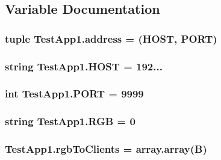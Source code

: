 \subsection{Variable Documentation}
\subsubsection[{\texorpdfstring{address}{address}}]{\setlength{\rightskip}{0pt plus 5cm}tuple Test\+App1.\+address = ({\bf H\+O\+ST}, {\bf P\+O\+RT})}\hypertarget{namespaceTestApp1_a37693e75a952244c15c4f328112913b6}{}\label{namespaceTestApp1_a37693e75a952244c15c4f328112913b6}
\subsubsection[{\texorpdfstring{H\+O\+ST}{HOST}}]{\setlength{\rightskip}{0pt plus 5cm}string Test\+App1.\+H\+O\+ST = \textquotesingle{}192...\textquotesingle{}}\hypertarget{namespaceTestApp1_a32675c1567f50c9219e268d339fefd25}{}\label{namespaceTestApp1_a32675c1567f50c9219e268d339fefd25}
\subsubsection[{\texorpdfstring{P\+O\+RT}{PORT}}]{\setlength{\rightskip}{0pt plus 5cm}int Test\+App1.\+P\+O\+RT = 9999}\hypertarget{namespaceTestApp1_a0a02ae4c9398345071f0ccdd43bc4f3d}{}\label{namespaceTestApp1_a0a02ae4c9398345071f0ccdd43bc4f3d}
\subsubsection[{\texorpdfstring{R\+GB}{RGB}}]{\setlength{\rightskip}{0pt plus 5cm}string Test\+App1.\+R\+GB = \textquotesingle{}0\textquotesingle{}}\hypertarget{namespaceTestApp1_afdb7789ca8ed6dc37128b8062410c2ab}{}\label{namespaceTestApp1_afdb7789ca8ed6dc37128b8062410c2ab}
\subsubsection[{\texorpdfstring{rgb\+To\+Clients}{rgbToClients}}]{\setlength{\rightskip}{0pt plus 5cm}Test\+App1.\+rgb\+To\+Clients = array.\+array(\textquotesingle{}B\textquotesingle{})}\hypertarget{namespaceTestApp1_a4b40f8b017c0288d808fb37465995c9b}{}\label{namespaceTestApp1_a4b40f8b017c0288d808fb37465995c9b}
